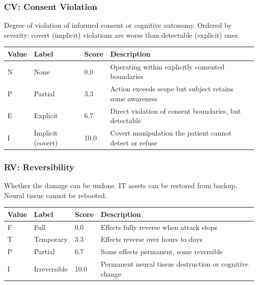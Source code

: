 \subsubsection{CV: Consent Violation}

Degree of violation of informed consent or cognitive autonomy. Ordered by
severity: covert (implicit) violations are worse than detectable (explicit) ones.

\begin{table}[H]
\centering
\small
\begin{tabular}{@{}l l l p{7cm}@{}}
\toprule
\textbf{Value} & \textbf{Label} & \textbf{Score} & \textbf{Description} \\
\midrule
N & None              & 0.0  & Operating within explicitly consented boundaries \\
P & Partial           & 3.3  & Action exceeds scope but subject retains some awareness \\
E & Explicit          & 6.7  & Direct violation of consent boundaries, but detectable \\
I & Implicit (covert) & 10.0 & Covert manipulation the patient cannot detect or refuse \\
\bottomrule
\end{tabular}
\end{table}

\subsubsection{RV: Reversibility}

Whether the damage can be undone. IT assets can be restored from backup. Neural
tissue cannot be rebooted.

\begin{table}[H]
\centering
\small
\begin{tabular}{@{}l l l p{7cm}@{}}
\toprule
\textbf{Value} & \textbf{Label} & \textbf{Score} & \textbf{Description} \\
\midrule
F & Full        & 0.0  & Effects fully reverse when attack stops \\
T & Temporary   & 3.3  & Effects reverse over hours to days \\
P & Partial     & 6.7  & Some effects permanent, some reversible \\
I & Irreversible & 10.0 & Permanent neural tissue destruction or cognitive change \\
\bottomrule
\end{tabular}
\end{table}


